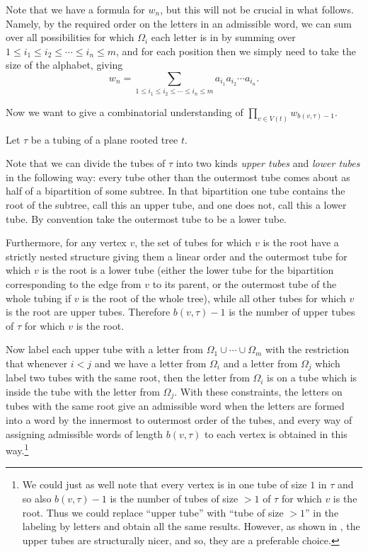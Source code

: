 \documentclass[oneside]{amsart}
\theoremstyle{definition}
\begin{document}
Note that we have a formula for $w_n$, but this will not be crucial in what follows.  Namely, by the required order on the letters in an admissible word, we can sum over all possibilities for which $\Omega_i$ each letter is in by summing over $1\leq i_1\leq i_2\leq \cdots \leq i_n \leq m$, and for each position then we simply need to take the size of the alphabet, giving 
\begin{equation}\label{eq number of admissible words}
w_n = \sum_{ 1\leq i_1\leq i_2\leq \cdots \leq i_n \leq m}a_{i_1}a_{i_2}\cdots a_{i_n}.
\end{equation}

Now we want to give a combinatorial understanding of $\prod_{v\in V(t)} w_{b(v,\tau)-1}$.

Let $\tau$ be a tubing of a plane rooted tree $t$.

Note that we can divide the tubes of $\tau$ into two kinds \emph{upper tubes} and \emph{lower tubes} in the following way: every tube other than the outermost tube comes about as half of a bipartition of some subtree.  In that bipartition one tube contains the root of the subtree, call this an upper tube, and one does not, call this a lower tube.  By convention take the outermost tube to be a lower tube.  

Furthermore, for any vertex $v$, the set of tubes for which $v$ is the root have a strictly nested structure giving them a linear order and the outermost tube for which $v$ is the root is a lower tube (either the lower tube for the bipartition corresponding to the edge from $v$ to its parent, or the outermost tube of the whole tubing if $v$ is the root of the whole tree), while all other tubes for which $v$ is the root are upper tubes.  Therefore $b(v, \tau)-1$ is the number of upper tubes of $\tau$ for which $v$ is the root.

Now label each upper tube with a letter from $\Omega_1\cup\cdots\cup \Omega_m$ with the restriction that whenever $i<j$ and we have a letter from $\Omega_i$ and a letter from $\Omega_j$ which label two tubes with the same root, then the letter from $\Omega_i$ is on a tube which is inside the tube with the letter from $\Omega_j$.  With these constraints, the letters on tubes with the same root give an admissible word when the letters are formed into a word by the innermost to outermost order of the tubes, and every way of assigning admissible words of length $b(v,\tau)$ to each vertex is obtained in this way.\footnote{We could just as well note that every vertex is in one tube of size $1$ in $\tau$ and so also $b(v,\tau)-1$ is the number of tubes of size $>1$ of $\tau$ for which $v$ is the root.  Thus we could replace ``upper tube'' with ``tube of size $>1$'' in the labeling by letters and obtain all the same results.  However, as shown in \cite{OHthesis}, the upper tubes are structurally nicer, and so, they are a preferable choice.}
\end{document}

